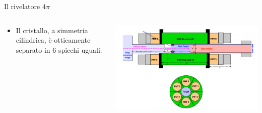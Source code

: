 \documentclass [xcolor=svgnames] {beamer}
\begin{document}
\begin{frame}{Il rivelatore $4\pi$}
	\begin{columns}
		\begin{column}{0.45\textwidth}
			\begin{itemize}
				\item Il cristallo, a simmetria cilindrica, è otticamente separato in 6 spicchi uguali.
			\end{itemize}
		\end{column}
		\begin{column}{0.45\textwidth}
			\centering
			\includegraphics[width=\textwidth]{img/BGO.png}
		\end{column}
	\end{columns}
\end{frame}


%		
%		
\end{document}
